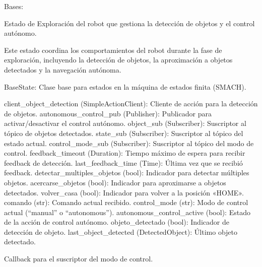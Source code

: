 \documentclass[a4paper,10pt,spanish]{sphinxmanual}
\begin{document}
\begin{fulllineitems}
\label{\detokenize{squad_state_manager:squad_state_manager.EstadoExploracion}}
\pysigstartsignatures
{}
\pysigstopsignatures
\sphinxAtStartPar
Bases: {\hyperref[\detokenize{squad_state_manager:squad_state_manager.BaseState}]{}}

\sphinxAtStartPar
Estado de Exploración del robot que gestiona la detección de objetos y el control autónomo.

\sphinxAtStartPar
Este estado coordina los comportamientos del robot durante la fase de exploración, incluyendo la
detección de objetos, la aproximación a objetos detectados y la navegación autónoma.
\begin{description}
\sphinxAtStartPar
BaseState: Clase base para estados en la máquina de estados finita (SMACH).

\sphinxAtStartPar
client\_object\_detection (SimpleActionClient): Cliente de acción para la detección de objetos.
autonomous\_control\_pub (Publisher): Publicador para activar/desactivar el control autónomo.
object\_sub (Subscriber): Suscriptor al tópico de objetos detectados.
state\_sub (Subscriber): Suscriptor al tópico del estado actual.
control\_mode\_sub (Subscriber): Suscriptor al tópico del modo de control.
feedback\_timeout (Duration): Tiempo máximo de espera para recibir feedback de detección.
last\_feedback\_time (Time): Última vez que se recibió feedback.
detectar\_multiples\_objetos (bool): Indicador para detectar múltiples objetos.
acercarse\_objetos (bool): Indicador para aproximarse a objetos detectados.
volver\_casa (bool): Indicador para volver a la posición «HOME».
comando (str): Comando actual recibido.
control\_mode (str): Modo de control actual (“manual” o “autonomous”).
autonomous\_control\_active (bool): Estado de la acción de control autónomo.
objeto\_detectado (bool): Indicador de detección de objeto.
last\_object\_detected (DetectedObject): Último objeto detectado.

\end{description}

\begin{fulllineitems}
\label{\detokenize{squad_state_manager:squad_state_manager.EstadoExploracion.control_mode_callback}}
\pysigstartsignatures
{}
\pysigstopsignatures
\sphinxAtStartPar
Callback para el suscriptor del modo de control.


\end{fulllineitems}
\end{fulllineitems}
\end{document}
